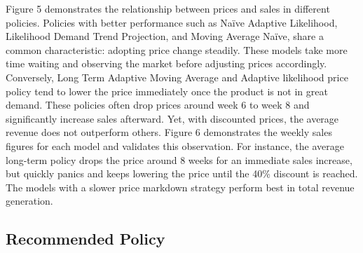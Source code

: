 \documentclass[11pt,a4paper]{article}
\begin{document}
Figure 5 demonstrates the relationship between prices and sales in different policies. 
Policies with better performance such as Naïve Adaptive Likelihood, Likelihood Demand Trend Projection, and Moving Average Naïve, share a common characteristic: adopting price change steadily. 
These models take more time waiting and observing the market before adjusting prices accordingly. 
Conversely, Long Term Adaptive Moving Average and Adaptive likelihood price policy tend to lower the price immediately once the product is not in great demand. 
These policies often drop prices around week 6 to week 8 and significantly increase sales afterward. 
Yet, with discounted prices, the average revenue does not outperform others. 
Figure 6 demonstrates the weekly sales figures for each model and validates this observation. 
For instance, the average long-term policy drops the price around 8 weeks for an immediate sales increase, but quickly panics and keeps lowering the price until the 40\% discount is reached. 
The models with a slower price markdown strategy perform best in total revenue generation. 


\subsection{Recommended Policy}

\pagebreak


\end{document}
